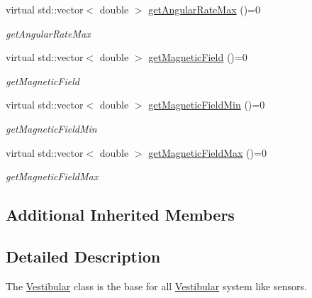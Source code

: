\begin{DoxyCompactItemize}
virtual std\-::vector$<$ double $>$ \hyperlink{classdrobot_1_1device_1_1vestibular_1_1Vestibular_aa8b14d53824fab9b37d1009a43d2000f}{get\-Angular\-Rate\-Max} ()=0
\begin{DoxyCompactList}\small\item\em get\-Angular\-Rate\-Max \end{DoxyCompactList}\item 
virtual std\-::vector$<$ double $>$ \hyperlink{classdrobot_1_1device_1_1vestibular_1_1Vestibular_af916767f525fde239401392308ebdd2d}{get\-Magnetic\-Field} ()=0
\begin{DoxyCompactList}\small\item\em get\-Magnetic\-Field \end{DoxyCompactList}\item 
virtual std\-::vector$<$ double $>$ \hyperlink{classdrobot_1_1device_1_1vestibular_1_1Vestibular_aedf3e81c5256febccfc8514fa3368322}{get\-Magnetic\-Field\-Min} ()=0
\begin{DoxyCompactList}\small\item\em get\-Magnetic\-Field\-Min \end{DoxyCompactList}\item 
virtual std\-::vector$<$ double $>$ \hyperlink{classdrobot_1_1device_1_1vestibular_1_1Vestibular_a47dcc13aab2c15633d25f33c92de035e}{get\-Magnetic\-Field\-Max} ()=0
\begin{DoxyCompactList}\small\item\em get\-Magnetic\-Field\-Max \end{DoxyCompactList}\end{DoxyCompactItemize}
\subsection*{Additional Inherited Members}


\subsection{Detailed Description}
The \hyperlink{classdrobot_1_1device_1_1vestibular_1_1Vestibular}{Vestibular} class is the base for all \hyperlink{classdrobot_1_1device_1_1vestibular_1_1Vestibular}{Vestibular} system like sensors. 

